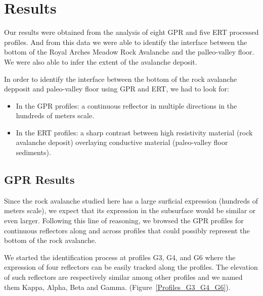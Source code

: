 \documentclass[5p]{elsarticle}
\begin{document}
\section{Results}
										
Our results were obtained from the analysis of eight GPR and five ERT processed profiles. And from this data we were able to identify the interface between the bottom of the Royal Arches Meadow Rock Avalanche and the palleo-valley floor. We were also able to infer the extent of the avalanche deposit.  

In order to identify the interface between the bottom of the rock avalanche depposit and paleo-valley floor using GPR and ERT, we had to look for:

\begin{itemize}
    \item In the GPR profiles: a continuous reflector in multiple directions in the hundreds of meters scale.
    \item In the ERT profiles: a sharp contrast between high resistivity material (rock avalanche deposit) overlaying conductive material (paleo-valley floor sediments).
\end{itemize}



		\subsection {GPR Results}
										
Since the rock avalanche studied here has a large surficial expression (hundreds of meters scale), we expect that its expression in the subsurface would be similar or even larger. Following this line of reasoning, we browsed the GPR profiles for continuous reflectors along and across profiles that could possibly represent the bottom of the rock avalanche. 

We started the identification process at profiles G3,  G4, and G6 where the expression of four reflectors can be easily tracked along the profiles. The elevation of such reflectors are respectively similar among other profiles and we named them Kappa, Alpha, Beta and Gamma. (Figure~\ref{Profiles_G3_G4_G6}). 
\end{document}
